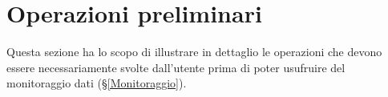 \section{Operazioni preliminari}\label{PreMonitoraggio}
Questa sezione ha lo scopo di illustrare in dettaglio le operazioni che devono essere necessariamente svolte dall'utente prima di poter usufruire del monitoraggio dati (§\ref{Monitoraggio}).





\pagebreak



\pagebreak

